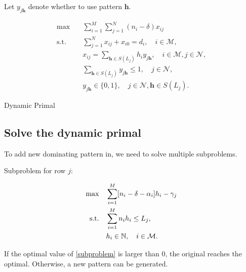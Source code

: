 Let $y_{j \bm{h}}$ denote whether to use pattern $\bm{h}$.

\begin{equation}\label{improve_primal}
    \begin{aligned}
    \max \quad & \sum_{i=1}^M \sum_{j=1}^N\left(n_i-\delta\right) x_{i j} \\
    \text {s.t.} \quad & \sum_{j=1}^N x_{i j} + x_{i0} = d_i, \quad i \in \mathcal{M}, \\
    & x_{i j}=\sum_{\bm{h} \in S(L_{j})} h_i y_{j \bm{h}}, \quad i \in \mathcal{M}, j \in \mathcal{N}, \\
    & \sum_{\bm{h} \in S(L_{j})} y_{j \bm{h}} \leq 1, \quad j \in \mathcal{N}, \\
    & y_{j \bm{h}} \in \{0,1\}, \quad j \in \mathcal{N}, \bm{h} \in S(L_{j}).
    \end{aligned}
\end{equation}


\begin{algorithm}[H]
    \caption{Dynamic Primal}\label{algo_improve_primal}
\end{algorithm}


\subsection{Solve the dynamic primal}
To add new dominating pattern in, we need to solve multiple subproblems.

Subproblem for row $j$:

\begin{align}\label{subproblem}
    \max \quad & \sum_{i=1}^{M} [n_i - \delta - \alpha_{i}] h_{i} - \gamma_{j} \\
    \text {s.t.} \quad & \sum_{i= 1}^{M} n_{i} h_{i} \leq L_j, \notag \\
    & h_{i} \in \mathbb{N}, \quad i \in \mathcal{M}. \notag
\end{align} 

If the optimal value of \eqref{subproblem} is larger than $0$, the original reaches the optimal. Otherwise, a new pattern can be generated.


